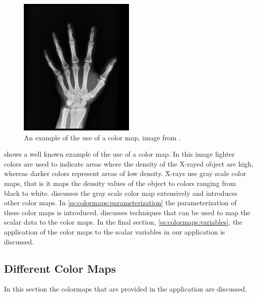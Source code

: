 
\begin{figure}
	\centering
	\includegraphics[width=0.5\textwidth, height=0.2\textheight, keepaspectratio]{colormapping/img/x-ray.jpg}
	\caption{An example of the use of a color map, image from \cite{xray}.}
	\label{fig:colormapping:xray}
\end{figure}

 shows a well known example of the use of a color map. In this image lighter colors are used to indicate areas where the density of the X-rayed object are high, whereas darker colors represent areas of low density. X-rays use gray scale color maps, that is it maps the density values of the object to colors ranging from black to white.  discusses the gray scale color map extensively and introduces other color maps. In \cref{ss:colormaps:parameterization} the parameterization of these color maps is introduced.  discusses techniques that can be used to map the scalar data to the color maps. In the final section, \cref{ss:colormaps:variables}, the application of the color maps to the scalar variables in our application is discussed.

\subsection{Different Color Maps}
\label{ss:colormaps:differentmaps}
In this section the colormaps that are provided in the application are discussed.

